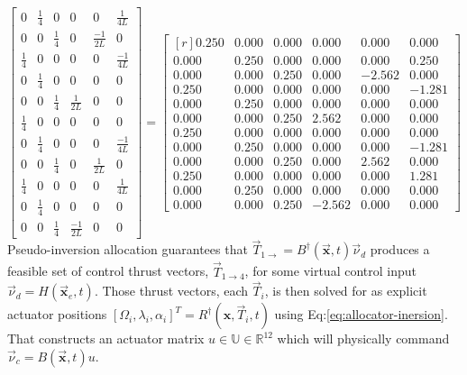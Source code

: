 \begin{subequations}
\begin{equation}
\begin{bmatrix}
0 & \frac{1}{4} & 0 & 0 & 0 & \frac{1}{4L}\\
0 & 0 & \frac{1}{4} & 0 & \frac{-1}{2L} & 0\\
\frac{1}{4} & 0 & 0 & 0 & 0 & \frac{-1}{4L}\\
0 & \frac{1}{4} & 0 & 0 & 0 & 0\\
0 & 0 & \frac{1}{4} & \frac{1}{2L} & 0 & 0\\
\frac{1}{4} & 0 & 0 & 0 & 0 & 0\\
0 & \frac{1}{4} & 0 & 0 & 0 & \frac{-1}{4L}\\
0 & 0 & \frac{1}{4} & 0 & \frac{1}{2L} & 0\\
\frac{1}{4} & 0 & 0 & 0 & 0 & \frac{1}{4L}\\
0 & \frac{1}{4} & 0 & 0 & 0 & 0\\
0 & 0 & \frac{1}{4} & \frac{-1}{2L} & 0 & 0
\end{bmatrix}
\end{equation}
\begin{equation}
=\begin{bmatrix*}[r]
0.250 & 0.000 & 0.000 & 0.000 & 0.000 & 0.000\\
0.000 & 0.250 & 0.000 & 0.000 & 0.000 & 0.250\\
0.000 & 0.000 & 0.250 & 0.000 & -2.562 & 0.000\\
0.250 & 0.000 & 0.000 & 0.000 & 0.000 & -1.281\\
0.000 & 0.250 & 0.000 & 0.000 & 0.000 & 0.000\\
0.000 & 0.000 & 0.250 & 2.562 & 0.000 & 0.000\\
0.250 & 0.000 & 0.000 & 0.000 & 0.000 & 0.000\\
0.000 & 0.250 & 0.000 & 0.000 & 0.000 & -1.281\\
0.000 & 0.000 & 0.250 & 0.000 & 2.562 & 0.000\\
0.250 & 0.000 & 0.000 & 0.000 & 0.000 & 1.281\\
0.000 & 0.250 & 0.000 & 0.000 & 0.000 & 0.000\\
0.000 & 0.000 & 0.250 & -2.562 & 0.000 & 0.000
\end{bmatrix*}
\end{equation}
\end{subequations}
Pseudo-inversion allocation guarantees that $\vec{T}_{1\rightarrow}=B^\dagger(\vec{\mathbf{x}},t)\vec{\nu}_d$ produces a feasible set of control thrust vectors, $\vec{T}_{1\rightarrow 4}$, for some virtual control input $\vec{\nu}_d=H(\vec{\mathbf{x}}_e,t)$.  Those thrust vectors, each $\vec{T}_{i}$, is then solved for as explicit actuator positions $[\Omega_i,\lambda_i,\alpha_i]^T=R^\dagger(\mathbf{x},\vec{T}_i,t)$ using Eq:\ref{eq:allocator-inersion}. That constructs an actuator matrix $u\in\mathbb{U}\in\mathbb{R}^{12}$ which will physically command $\vec{\nu}_c=B(\vec{\mathbf{x}},t)u$. 
